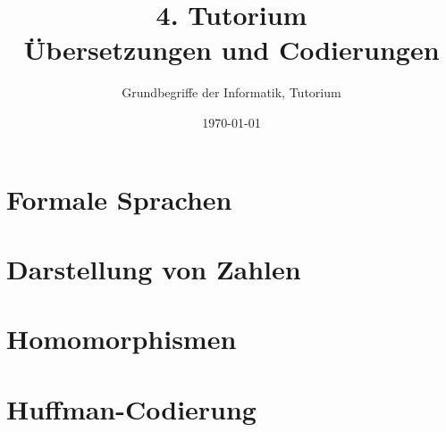 




\title[Übersetzungen und Codierungen]{4. Tutorium\\ Übersetzungen und Codierungen}
\subtitle{Grundbegriffe der Informatik, Tutorium \hashtag\mytutnumber}
\date{\today}


\titleframe
\roadmap

%
%

\section{Formale Sprachen}


\section{Darstellung von Zahlen}


\section{Homomorphismen}


\section{Huffman-Codierung}


